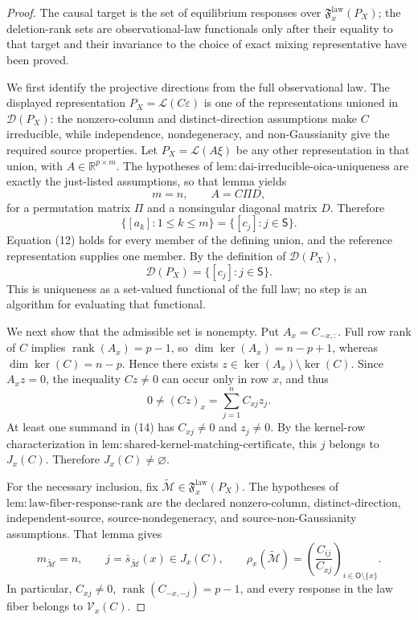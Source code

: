 \documentclass{article}
\begin{document}
\begin{proof}
The causal target is the set of equilibrium responses over \(\mathfrak F_x^{\mathrm{law}}(P_X)\); the deletion-rank sets are observational-law functionals only after their equality to that target and their invariance to the choice of exact mixing representative have been proved.

We first identify the projective directions from the full observational law. The displayed representation \(P_X=\mathcal L(C\varepsilon)\) is one of the representations unioned in \(\mathcal D(P_X)\): the nonzero-column and distinct-direction assumptions make \(C\) irreducible, while independence, nondegeneracy, and non-Gaussianity give the required source properties. Let \(P_X=\mathcal L(A\xi)\) be any other representation in that union, with \(A\in\mathbb R^{p\times m}\). The hypotheses of \(\mathrm{lem{:}dai\text{-}irreducible\text{-}oica\text{-}uniqueness}\) are exactly the just-listed assumptions, so that lemma yields
\[
 m=n,
 \qquad
 A=C\Pi D, \tag{11}
\]
for a permutation matrix \(\Pi\) and a nonsingular diagonal matrix \(D\). Therefore
\[
 \{[a_k]:1\le k\le m\}=\{[c_j]:j\in\mathsf S\}. \tag{12}
\]
Equation (12) holds for every member of the defining union, and the reference representation supplies one member. By the definition of \(\mathcal D(P_X)\),
\[
 \mathcal D(P_X)=\{[c_j]:j\in\mathsf S\}. \tag{13}
\]
This is uniqueness as a set-valued functional of the full law; no step is an algorithm for evaluating that functional.

We next show that the admissible set is nonempty. Put \(A_x=C_{-x,:}\). Full row rank of \(C\) implies \(\operatorname{rank}(A_x)=p-1\), so \(\dim\ker(A_x)=n-p+1\), whereas \(\dim\ker(C)=n-p\). Hence there exists \(z\in\ker(A_x)\setminus\ker(C)\). Since \(A_xz=0\), the inequality \(Cz\ne0\) can occur only in row \(x\), and thus
\[
 0\ne(Cz)_x=\sum_{j=1}^n C_{xj}z_j. \tag{14}
\]
At least one summand in (14) has \(C_{xj}\ne0\) and \(z_j\ne0\). By the kernel-row characterization in \(\mathrm{lem{:}shared\text{-}kernel\text{-}matching\text{-}certificate}\), this \(j\) belongs to \(J_x(C)\). Therefore \(J_x(C)\ne\varnothing\).

For the necessary inclusion, fix \(\widetilde{\mathcal M}\in\mathfrak F_x^{\mathrm{law}}(P_X)\). The hypotheses of \(\mathrm{lem{:}law\text{-}fiber\text{-}response\text{-}rank}\) are the declared nonzero-column, distinct-direction, independent-source, source-nondegeneracy, and source-non-Gaussianity assumptions. That lemma gives
\[
 m_{\widetilde{\mathcal M}}=n,
 \qquad
 j=\bar s_{\widetilde{\mathcal M}}(x)\in J_x(C),
 \qquad
 \rho_x(\widetilde{\mathcal M})
 =\left(\frac{C_{ij}}{C_{xj}}\right)_{i\in\mathsf O\setminus\{x\}}. \tag{15}
\]
In particular, \(C_{xj}\ne0\), \(\operatorname{rank}(C_{-x,-j})=p-1\), and every response in the law fiber belongs to \(\mathcal V_x(C)\).


\end{proof}
\end{document}
